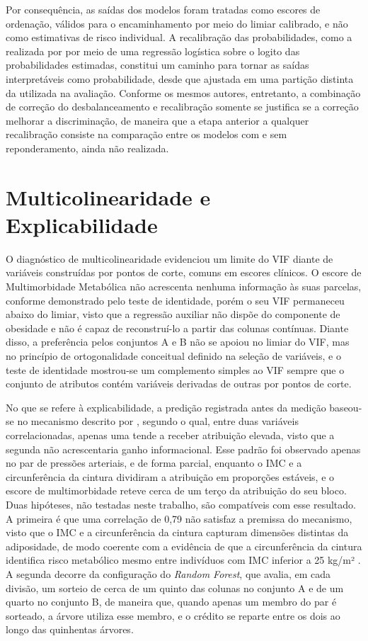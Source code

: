 Por consequência, as saídas dos modelos foram tratadas como escores de ordenação, válidos para o encaminhamento por meio do limiar calibrado, e não como estimativas de risco individual. A recalibração das probabilidades, como a realizada por \textcite{vandengoorbergh2022harm} por meio de uma regressão logística sobre o logito das probabilidades estimadas, constitui um caminho para tornar as saídas interpretáveis como probabilidade, desde que ajustada em uma partição distinta da utilizada na avaliação. Conforme os mesmos autores, entretanto, a combinação de correção do desbalanceamento e recalibração somente se justifica se a correção melhorar a discriminação, de maneira que a etapa anterior a qualquer recalibração consiste na comparação entre os modelos com e sem reponderamento, ainda não realizada.

\section{Multicolinearidade e Explicabilidade}\label{sec:disc-explicabilidade}
O diagnóstico de multicolinearidade evidenciou um limite do VIF diante de variáveis construídas por pontos de corte, comuns em escores clínicos. O escore de Multimorbidade Metabólica não acrescenta nenhuma informação às suas parcelas, conforme demonstrado pelo teste de identidade, porém o seu VIF permaneceu abaixo do limiar, visto que a regressão auxiliar não dispõe do componente de obesidade e não é capaz de reconstruí-lo a partir das colunas contínuas. Diante disso, a preferência pelos conjuntos A e B não se apoiou no limiar do VIF, mas no princípio de ortogonalidade conceitual definido na seleção de variáveis, e o teste de identidade mostrou-se um complemento simples ao VIF sempre que o conjunto de atributos contém variáveis derivadas de outras por pontos de corte.

No que se refere à explicabilidade, a predição registrada antes da medição baseou-se no mecanismo descrito por \textcite{Salih2024}, segundo o qual, entre duas variáveis correlacionadas, apenas uma tende a receber atribuição elevada, visto que a segunda não acrescentaria ganho informacional. Esse padrão foi observado apenas no par de pressões arteriais, e de forma parcial, enquanto o IMC e a circunferência da cintura dividiram a atribuição em proporções estáveis, e o escore de multimorbidade reteve cerca de um terço da atribuição do seu bloco. Duas hipóteses, não testadas neste trabalho, são compatíveis com esse resultado. A primeira é que uma correlação de 0,79 não satisfaz a premissa do mecanismo, visto que o IMC e a circunferência da cintura capturam dimensões distintas da adiposidade, de modo coerente com a evidência de que a circunferência da cintura identifica risco metabólico mesmo entre indivíduos com IMC inferior a 25 kg/m² \cite{Feller2010}. A segunda decorre da configuração do \textit{Random Forest}, que avalia, em cada divisão, um sorteio de cerca de um quinto das colunas no conjunto A e de um quarto no conjunto B, de maneira que, quando apenas um membro do par é sorteado, a árvore utiliza esse membro, e o crédito se reparte entre os dois ao longo das quinhentas árvores.

